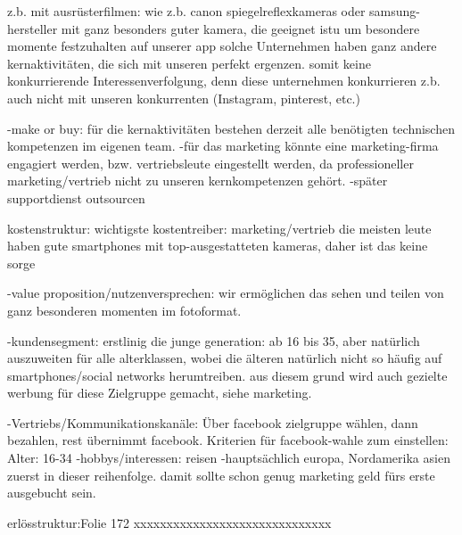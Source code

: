  z.b. mit ausrüsterfilmen: wie z.b. canon spiegelreflexkameras oder samsung-hersteller mit ganz besonders guter kamera, die geeignet istu
 um besondere momente festzuhalten auf unserer app
 solche Unternehmen haben ganz andere kernaktivitäten, die sich mit unseren perfekt ergenzen.
 somit keine konkurrierende Interessenverfolgung, denn diese unternehmen konkurrieren z.b.
 auch nicht mit unseren konkurrenten (Instagram, pinterest, etc.)
 
 -make or buy:
 für die kernaktivitäten bestehen derzeit alle benötigten technischen kompetenzen im eigenen team.
 -für das marketing könnte eine marketing-firma engagiert werden, bzw. vertriebsleute eingestellt werden,
 da professioneller marketing/vertrieb nicht zu unseren kernkompetenzen gehört.
 -später supportdienst outsourcen

 kostenstruktur: wichtigste kostentreiber:
 marketing/vertrieb
 die meisten leute haben gute smartphones mit top-ausgestatteten kameras, daher ist das keine sorge
 
 -value proposition/nutzenversprechen: wir ermöglichen das sehen und teilen von ganz besonderen momenten im fotoformat.
 
 -kundensegment: erstlinig die junge generation: ab 16 bis 35, aber natürlich auszuweiten für alle alterklassen, wobei
 die älteren natürlich nicht so häufig auf smartphones/social networks herumtreiben.
 aus diesem grund wird auch gezielte werbung für diese Zielgruppe gemacht, siehe marketing.
 
 -Vertriebs/Kommunikationskanäle:
 Über facebook zielgruppe wählen, dann bezahlen, rest übernimmt facebook.
 Kriterien für facebook-wahle zum einstellen:
 Alter: 16-34
 -hobbys/interessen: reisen
 -hauptsächlich europa, Nordamerika asien  zuerst in dieser reihenfolge.
 damit sollte schon genug marketing geld fürs erste ausgebucht sein.
 
 erlösstruktur:Folie 172
 xxxxxxxxxxxxxxxxxxxxxxxxxxxxxx
